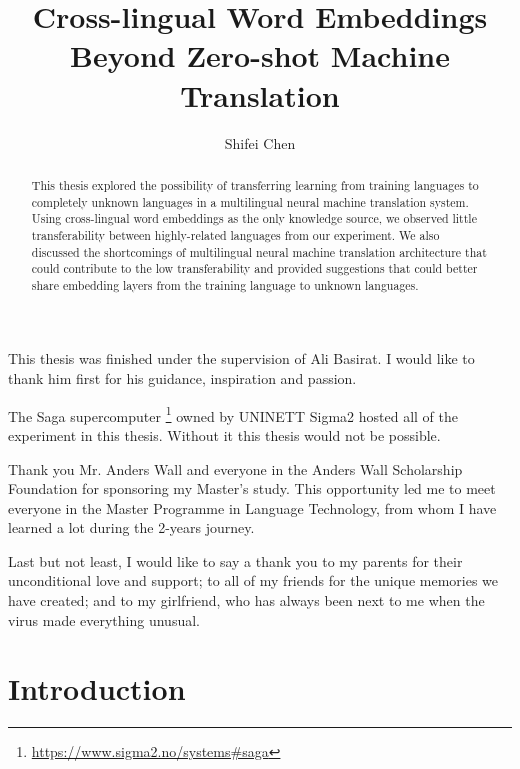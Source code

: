 \documentclass[thesis,fonts=libertine]{cluu}
\begin{document}
\author{Shifei Chen}
\title{Cross-lingual Word Embeddings Beyond Zero-shot Machine Translation}

\maketitle

\begin{abstract}
  This thesis explored the possibility of transferring learning from training languages to completely unknown languages in a multilingual neural machine translation system. Using cross-lingual word embeddings as the only knowledge source, we observed little transferability between highly-related languages from our experiment. We also discussed the shortcomings of multilingual neural machine translation architecture that could contribute to the low transferability and provided suggestions that could better share embedding layers from the training language to unknown languages.
\end{abstract}

\tableofcontents


This thesis was finished under the supervision of Ali Basirat. I would like 
to thank him first for his guidance, inspiration and passion.

The Saga supercomputer \footnote{\url{https://www.sigma2.no/systems\#saga}} owned by UNINETT Sigma2 hosted all of the experiment in this thesis. Without it this thesis would not be possible.

Thank you Mr. Anders Wall and everyone in the Anders Wall Scholarship Foundation for sponsoring my Master's study. This opportunity led me to meet everyone in the Master Programme in Language Technology, from whom I have learned a lot during the 2-years journey.

Last but not least, I would like to say a thank you to my parents for their unconditional love and support; to all of my friends for the unique memories we have created; and to my girlfriend, who has always been next to me when the virus made everything unusual.


\chapter{Introduction}
\end{document}
